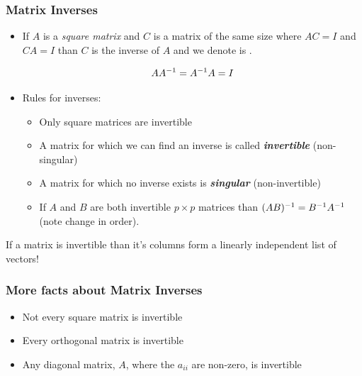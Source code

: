 \documentclass{beamer}
\begin{document}
\begin{frame}
  \frametitle{Matrix Inverses}

\begin{itemize}
\item If $A$ is a \emph{square matrix} and $C$ is a matrix of the same size where $AC = I$ and $CA=I$ than $C$ is the inverse of $A$ and we denote is .

\[
AA^{-1} = A^{-1}A = I
\]


\item Rules for inverses:

\begin{itemize}
 \item Only square matrices are invertible
 \item A matrix for which we can find an inverse is called \emph{\textbf{invertible}} (non-singular)
 \item A matrix for which no inverse exists is \emph{\textbf{singular}} (non-invertible)
 \item If $A$ and $B$ are both invertible $p \times p$ matrices than $(AB)^{-1} = B^{-1} A^{-1}$ (note change in order).
\end{itemize}
 
\end{itemize}

\begin{Highlight}
  If a matrix is invertible than it's columns form a linearly independent list of vectors!
\end{Highlight}

\end{frame}

\begin{frame}
  \frametitle{More facts about Matrix Inverses}

 \begin{itemize}
 \item Not every square matrix is invertible
 \item Every orthogonal matrix is invertible
 \item Any diagonal matrix, $A$, where the $a_{ii}$ are non-zero, is invertible
 \end{itemize}
 
\end{frame} 
\end{document}
